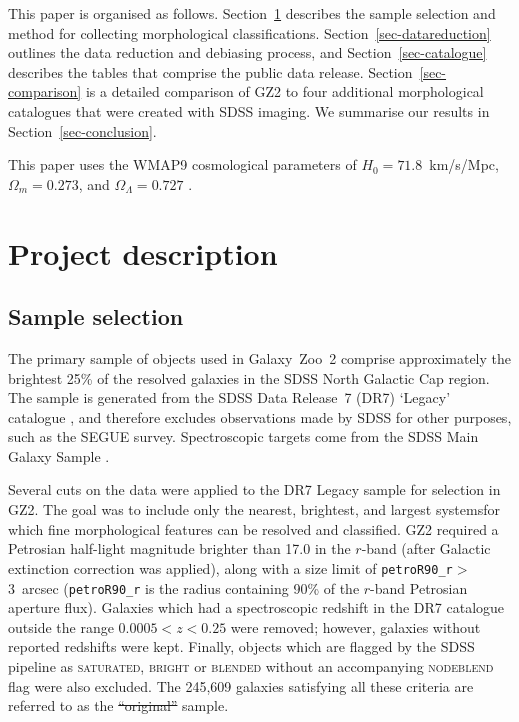 \documentclass[useAMS,usenatbib]{mn2e}
\providecommand{\DIFaddtex}[1]{{\protect\color{blue}\uwave{#1}}} %
\providecommand{\DIFdeltex}[1]{{\protect\color{red}\sout{#1}}}                      %
\providecommand{\DIFaddbegin}{} %
\providecommand{\DIFaddend}{} %
\providecommand{\DIFdelbegin}{} %
\providecommand{\DIFdelend}{} %
\providecommand{\DIFadd}[1]{\texorpdfstring{\DIFaddtex{#1}}{#1}} %
\providecommand{\DIFdel}[1]{\texorpdfstring{\DIFdeltex{#1}}{}} %
\begin{document}
This paper is organised as follows. Section~\ref{sec-description} describes the sample selection and method for collecting morphological classifications. Section~\ref{sec-datareduction} outlines the data reduction and debiasing process, and Section~\ref{sec-catalogue} describes the tables that comprise the public data release. Section~\ref{sec-comparison} is a detailed comparison of GZ2 to four additional morphological catalogues that were created with SDSS imaging. We summarise our results in Section~\ref{sec-conclusion}. 

This paper uses the WMAP9 cosmological parameters of $H_0=71.8$~km/s/Mpc, $\Omega_m = 0.273$, and $\Omega_\Lambda = 0.727$ \citep{hin12}. 


\section{Project description} \label{sec-description}

\subsection{Sample selection} \label{ssec-sample}
The primary sample of objects used in Galaxy~Zoo~2 comprise approximately the brightest 25\% of the resolved galaxies in the SDSS North Galactic Cap region. The sample is generated from the SDSS Data Release~7 (DR7) `Legacy' catalogue \citep{aba09}, and therefore excludes observations made by SDSS for other purposes, such as the SEGUE survey. Spectroscopic targets come from the SDSS Main Galaxy Sample \citep{str02}.

Several cuts on the data were applied to the DR7 Legacy sample for selection in GZ2. The goal was to include only the nearest, brightest, and largest systems\DIFaddbegin \DIFadd{, those }\DIFaddend for which fine morphological features can be resolved and classified. GZ2 required a Petrosian half-light magnitude brighter than 17.0 in the $r$-band (after Galactic extinction correction was applied), along with a size limit of {\tt petroR90\_r}$>$3~arcsec ({\tt petroR90\_r} is the radius containing 90\% of the $r$-band Petrosian aperture flux). Galaxies which had a spectroscopic redshift in the DR7 catalogue outside the range $0.0005<z<0.25$ were removed; however, galaxies without reported redshifts were kept. Finally, objects which are flagged by the SDSS pipeline as \textsc{saturated}, \textsc{bright} or \textsc{blended} without an accompanying \textsc{nodeblend} flag were also excluded. The 245,609 galaxies satisfying all these criteria are referred to as the \DIFdelbegin \DIFdel{``original'' }\DIFdelend \DIFaddbegin \DIFadd{`original' }\DIFaddend sample.  
\end{document}
